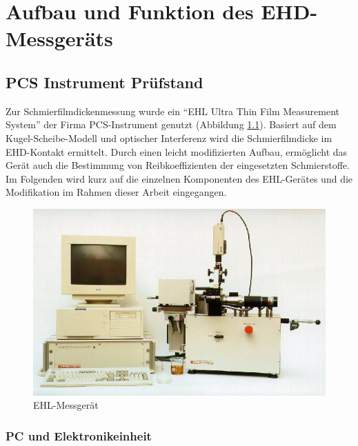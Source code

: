 \chapter{Aufbau und Funktion des EHD-Messgeräts}
\label{chap:aufbau_und_funktion_des_ehd_messgeraets}

\section{PCS Instrument Prüfstand}
\label{sec:pcs_pruefstand}

Zur Schmierfilmdickenmessung wurde ein ``EHL Ultra Thin Film Measurement System'' der Firma PCS-Instrument genutzt (Abbildung \ref{fig:ehl_messgeraet}).
Basiert auf dem Kugel-Scheibe-Modell und optischer Interferenz wird die Schmierfilmdicke im EHD-Kontakt ermittelt.
Durch einen leicht modifizierten Aufbau, ermöglicht das Gerät auch die Bestimmung von Reibkoeffizienten der eingesetzten Schmierstoffe.
Im Folgenden wird kurz auf die einzelnen Komponenten des EHL-Gerätes und die Modifikation im Rahmen dieser Arbeit eingegangen.

\begin{figure}[htb]
    \centering
    \includegraphics[width=0.8\linewidth]{./images/ehl_pruefstand.png}
    \caption{EHL-Messgerät \cite{ehl}}
    \label{fig:ehl_messgeraet}
\end{figure}

\subsection{PC und Elektronikeinheit}
\label{sub:pc_elektronikeinheit}

